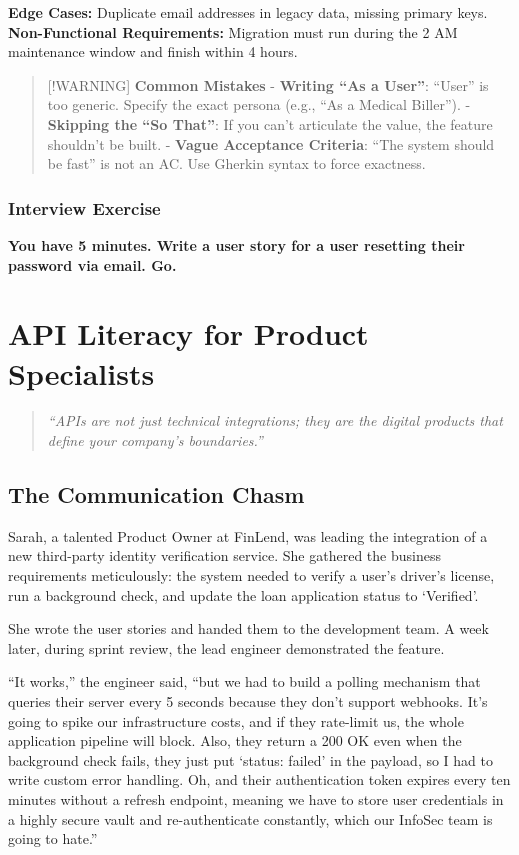 \textbf{Edge Cases:} Duplicate email addresses in legacy data, missing
primary keys. \textbf{Non-Functional Requirements:} Migration must run
during the 2 AM maintenance window and finish within 4 hours.

\begin{quote}
{[}!WARNING{]} \textbf{Common Mistakes} - \textbf{Writing ``As a
User''}: ``User'' is too generic. Specify the exact persona (e.g., ``As
a Medical Biller''). - \textbf{Skipping the ``So That''}: If you can't
articulate the value, the feature shouldn't be built. - \textbf{Vague
Acceptance Criteria}: ``The system should be fast'' is not an AC. Use
Gherkin syntax to force exactness.
\end{quote}

\subsection{Interview Exercise}\label{interview-exercise}

\textbf{You have 5 minutes. Write a user story for a user resetting
their password via email. Go.}

\chapter{API Literacy for Product
Specialists}\label{api-literacy-for-product-specialists}

\begin{quote}
\emph{``APIs are not just technical integrations; they are the digital
products that define your company's boundaries.''}
\end{quote}

\section{The Communication Chasm}\label{the-communication-chasm}

Sarah, a talented Product Owner at FinLend, was leading the integration
of a new third-party identity verification service. She gathered the
business requirements meticulously: the system needed to verify a user's
driver's license, run a background check, and update the loan
application status to `Verified'.

She wrote the user stories and handed them to the development team. A
week later, during sprint review, the lead engineer demonstrated the
feature.

``It works,'' the engineer said, ``but we had to build a polling
mechanism that queries their server every 5 seconds because they don't
support webhooks. It's going to spike our infrastructure costs, and if
they rate-limit us, the whole application pipeline will block. Also,
they return a 200 OK even when the background check fails, they just put
`status: failed' in the payload, so I had to write custom error
handling. Oh, and their authentication token expires every ten minutes
without a refresh endpoint, meaning we have to store user credentials in
a highly secure vault and re-authenticate constantly, which our InfoSec
team is going to hate.''

